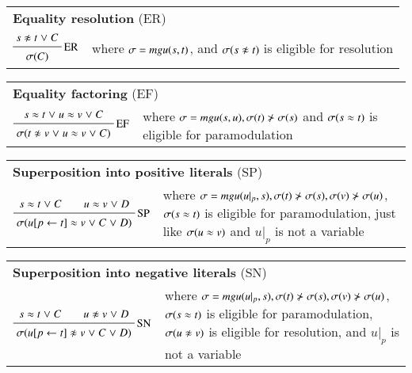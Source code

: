 \medskip
\begin{tabular}{m{}m{}}
    \multicolumn{2}{l}{{\bf Equality resolution} (ER)} \\[\jot]
    $\namedinference{ER}{s \noteq t \llor C}{\sigmacl{C}}$ & where $\sigma = \mathit{mgu}(s,t)$, and $\sigmacl{s \noteq t}$ is eligible for resolution
\end{tabular}

\medskip

\begin{tabular}{m{}m{}}
    \multicolumn{2}{l}{{\bf Equality factoring} (EF)} \\[\jot]
    $\namedinference{EF}{s \eq t \llor u \eq v \llor C}{\sigmacl{t \noteq v \llor u \eq v \llor C}}$ 
        & where $\sigma = \mathit{mgu}(s,u), \sigma(t) \not\succ \sigma(s)$ and 
        $\sigma(s \approx t)$ is eligible for paramodulation
\end{tabular}

\medskip

\begin{tabular}{m{}m{}}
    \multicolumn{2}{l}{{\bf Superposition into positive literals} (SP)} \\[\jot]
    $\namedinference{SP}{s \eq t \llor C \qquad u \eq v \llor D}{\sigmacl{u[p \leftarrow t] \eq v \llor C \llor D}}$ 
        & where $\sigma = \mathit{mgu}(u|_p, s), \sigma(t) \not\succ \sigma(s), \sigma(v) \not\succ \sigma(u)$,
        $\sigma(s \approx t)$ is eligible for paramodulation, just like $\sigma(u \approx v)$ and $u|_p$ is not a variable
\end{tabular}

\medskip

\begin{tabular}{m{}m{}}
    \multicolumn{2}{l}{{\bf Superposition into negative literals} (SN)} \\[\jot]
    $\namedinference{SN}{s \eq t \llor C \qquad u \noteq v \llor D}{\sigmacl{u[p \leftarrow t] \noteq v \llor C \llor D}}$ 
        & where $\sigma = \mathit{mgu}(u|_p, s), \sigma(t) \not\succ \sigma(s), \sigma(v) \not\succ \sigma(u)$,
         $\sigma(s \approx t)$ is eligible for paramodulation, $\sigmacl{u \noteq v}$ is eligible for resolution, and $u|_p$ is not a variable
\end{tabular}

